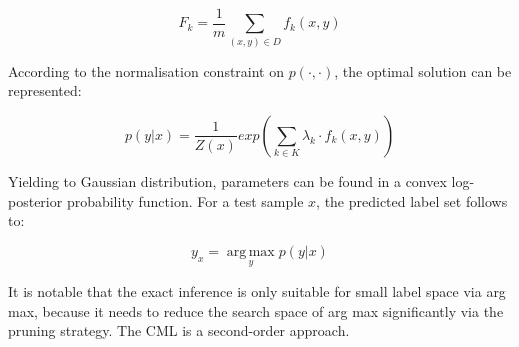 \begin{equation}\label{eq:CMLExpect}
F_{k} = \frac{1}{m}\sum_{(x,y) \in D}f_{k}(x,y)
\end{equation}

According to the normalisation constraint on $p(\cdot,\cdot)$, the optimal solution can be represented:

\begin{equation}\label{eq:CMLOptimal}
p(y|x) = \frac{1}{Z(x)}exp(\sum_{k \in K}\lambda_{k} \cdot f_{k}(x,y))
\end{equation}

Yielding to Gaussian distribution, parameters can be found in a convex log-posterior probability function. For a test sample $x$, the predicted label set follows to:

\begin{equation}\label{eq:CMLLabel}
y_{x} = \operatorname*{arg\,max}_{y} p(y|x)
\end{equation}

It is notable that the exact inference is only suitable for small label space via arg max, because it needs to reduce the search space of arg max significantly via the pruning strategy. The CML is a second-order approach.